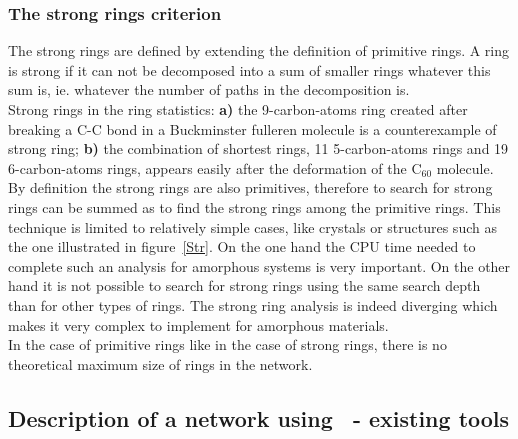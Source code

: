 \subsubsection{The strong rings criterion}

The strong rings \cite{Goetzke-127.215, YuanCormack-24-343} are defined by extending the definition of primitive rings. 
A ring is strong if it can not be decomposed into a sum of smaller rings whatever this sum is, ie. whatever the number of paths in the decomposition is. \\
{Strong rings in the ring statistics: {\bf{a)}} the 9-carbon-atoms ring created after breaking a C-C bond in a Buckminster fulleren molecule is a counterexample of strong ring; {\bf{b)}} the combination of shortest rings, 11 5-carbon-atoms rings and 19 6-carbon-atoms rings, appears easily after the deformation of the C$_{60}$ molecule.}
\laf By definition the strong rings are also primitives, therefore to search for strong rings can be summed as to find the strong rings among the primitive rings. 
This technique is limited to relatively simple cases, like crystals or structures such as the one illustrated in figure~\ref{Str}. 
On the one hand the CPU time needed to complete such an analysis for amorphous systems is very important. 
On the other hand it is not possible to search for strong rings using the same search depth than for other types of rings. 
The strong ring analysis is indeed diverging which makes it very complex to implement for amorphous materials. \\
In the case of primitive rings like in the case of strong rings, there is no theoretical maximum size of rings in the network.

\newpage
\subsection{Description of a network using \rstat\ - existing tools}
\label{etools}


